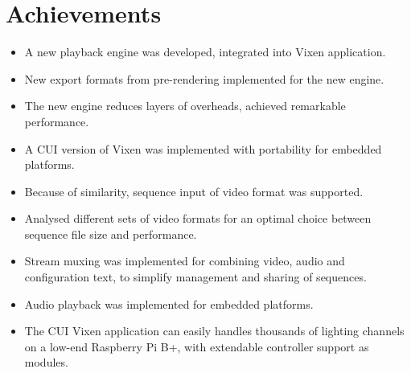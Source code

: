 \section{Achievements}


\begin{itemize}[noitemsep]
  \item A new playback engine was developed, integrated into Vixen application.
  \item New export formats from pre-rendering implemented for the new engine.
  \item The new engine reduces layers of overheads, achieved remarkable performance.
  \item A CUI version of Vixen was implemented with portability for embedded platforms.
  \item Because of similarity, sequence input of video format was supported.
  \item Analysed different sets of video formats for an optimal choice between sequence file size and performance.
  \item Stream muxing was implemented for combining video, audio and configuration text, to simplify management and sharing of sequences.
  \item Audio playback was implemented for embedded platforms.
  \item The CUI Vixen application can easily handles thousands of lighting channels on a low-end Raspberry Pi B+, with extendable controller support as modules.
\end{itemize}
